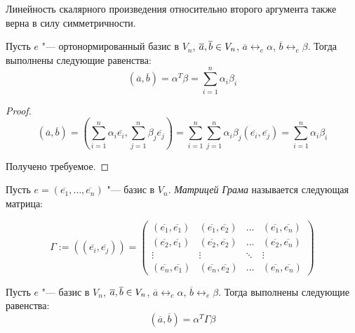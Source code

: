     \begin{note}
    	Линейность скалярного произведения относительно второго аргумента также верна в силу симметричности.
    \end{note}
    
    \begin{proposition}
    	Пусть $e$ "--- ортонормированный базис в $V_n$, $\overline{a}, \overline{b} \hm{\in} V_n$, $\overline{a} \leftrightarrow_{e} \alpha$, $\overline{b} \leftrightarrow_{e} \beta$. Тогда выполнены следующие равенства:
    	\[(\overline{a}, \overline{b}) = \alpha^T\beta = \sum_{i = 1}^{n}\alpha_i\beta_i\]
    \end{proposition}
    
    \begin{proof}
    	\[(\overline{a}, \overline{b}) = \left(\sum_{i = 1}^{n}\alpha_i\overline{e_i}, \sum_{j = 1}^{n}\beta_j\overline{e_j}\right) = \sum_{i = 1}^{n}\sum_{j = 1}^{n}\alpha_i\beta_j(\overline{e_i}, \overline{e_j}) = \sum_{i = 1}^{n}\alpha_i\beta_i\]
    	
    	Получено требуемое.
    \end{proof}

    \begin{definition}
    	Пусть $e = (\overline{e_1}, \dots, \overline{e_n})$ "--- базис в $V_n$. \textit{Матрицей Грама} называется следующая матрица:
    	
    	\[\Gamma := \left((\overline{e_i}, \overline{e_j})\right) =
    	\begin{pmatrix}
    	(\overline{e_1}, \overline{e_1}) & (\overline{e_1}, \overline{e_2}) & \dots & (\overline{e_1}, \overline{e_n}) \\
    	(\overline{e_2}, \overline{e_1}) & (\overline{e_2}, \overline{e_2}) & \dots & (\overline{e_2}, \overline{e_n}) \\
    	\vdots & \vdots & \ddots & \vdots \\
    	(\overline{e_n}, \overline{e_1}) & (\overline{e_n}, \overline{e_2}) & \dots & (\overline{e_n}, \overline{e_n})
    	\end{pmatrix}\]
    \end{definition}
    
    \begin{proposition}
    	Пусть $e$ "--- базис в $V_n$, $\overline{a}, \overline{b} \hm{\in} V_n$, $\overline{a} \leftrightarrow_{e} \alpha$, $\overline{b} \leftrightarrow_{e} \beta$. Тогда выполнены следующие равенства:
    	\[(\overline{a}, \overline{b}) = \alpha^T\Gamma\beta\]
    \end{proposition}
    

